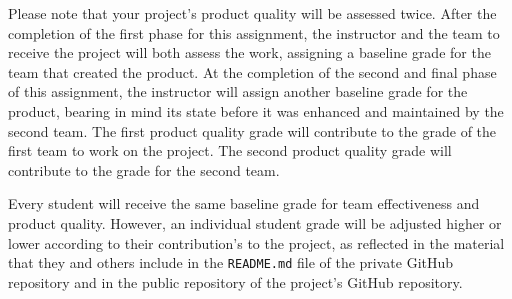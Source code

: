\documentclass[11pt]{article}
\newcommand{\reflection}{\lstinline{README.md}}
\begin{document}
Please note that your project's product quality will be assessed twice. After the completion of the first phase for this
assignment, the instructor and the team to receive the project will both assess the work, assigning a baseline grade for
the team that created the product. At the completion of the second and final phase of this assignment, the instructor
will assign another baseline grade for the product, bearing in mind its state before it was enhanced and maintained by
the second team. The first product quality grade will contribute to the grade of the first team to work on the project.
The second product quality grade will contribute to the grade for the second team.

Every student will receive the same baseline grade for team effectiveness and product quality. However, an individual
student grade will be adjusted higher or lower according to their contribution's to the project, as reflected in the
material that they and others include in the \reflection{} file of the private GitHub repository and in the public
repository of the project's GitHub repository.



\end{document}
